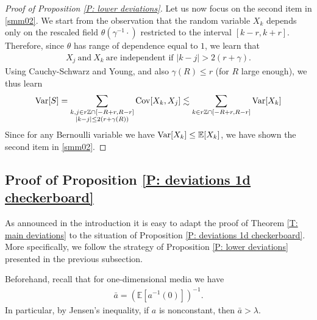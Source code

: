 \documentclass[12pt]{amsart}
\newcommand{\E}{\mathbb{E}}
\begin{document}
\begin{proof}[Proof of Proposition \ref{P: lower deviations}]
	Let us now focus on the second item in \eqref{smm02}. We start from the observation that the random variable $ X_k $ depends only on the rescaled field $ \theta ( \gamma^{-1} \cdot )$ restricted to the interval $  [ k - r , k + r ]  $. Therefore, since $ \theta$ has range of dependence equal to $1$, we learn that
	\begin{align*}
		X_{ j } ~ \text{and} ~ X_k ~ \text{are independent if~} | k - j | > 2 ( r + \gamma ) .
	\end{align*}
	Using Cauchy-Schwarz and Young, and also $ \gamma(R) \leq r $ (for $R$ large enough), we thus learn
	\begin{align*}
		{ \rm Var } [ S ]
		= \sum_{ \substack{ k , j  \in r \mathbb{Z} \cap [ - R + r , R -  r  ] \\ | k - j | \leq 2 ( r + \gamma(R) ) } } { \rm Cov } [ X_k , X_j ]
		\lesssim  \sum_{ k \in r \mathbb{Z} \cap [ - R + r , R - r  ] } { \rm Var } [ X_k ]
	\end{align*}
	Since for any Bernoulli variable we have $ { \rm Var } [ X_k ] \leq \mathbb{E} [ X_k ] $, we have shown the second item in \eqref{smm02}.
\end{proof}

\subsection{Proof of Proposition \ref{P: deviations 1d checkerboard}}\label{S: deviations 1d checkerboard}

As announced in the introduction it is easy to adapt the proof of Theorem \ref{T: main deviations} to the situation of Proposition \ref{P: deviations 1d checkerboard}. More specifically, we follow the strategy of Proposition \ref{P: lower deviations} presented in the previous subsection.

Beforehand, recall that for one-dimensional media we have
%
\begin{align*}
    \bar a = ( \E[ a^{ - 1 } ( 0 ) ] )^{ - 1 } .
\end{align*}
%
In particular, by Jensen's inequality, if $ a $ is nonconstant, then $ \bar a > \lambda $.
\end{document}
